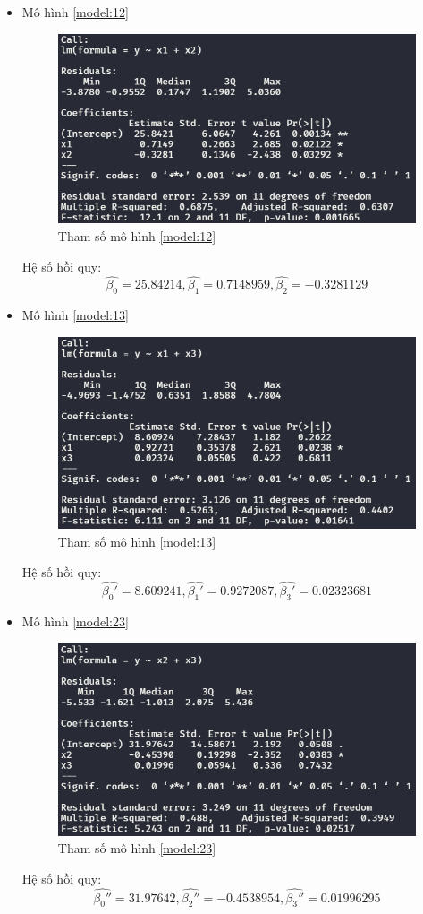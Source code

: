 \documentclass[a4paper]{article}
\theoremstyle{nonumberplain}
\begin{document}
\begin{itemize}
	\item Mô hình \ref{model:12}
	\begin{figure}[h!]
		\centering
		\includegraphics[width=0.7\linewidth]{bai-3-5-model-1}
		\caption{Tham số mô hình \ref{model:12}}
		\label{fig:bai-3-5-model-1}
	\end{figure}
	
	Hệ số hồi quy:
	\[\hat{\beta_0}=25.84214, \hat{\beta_1}=0.7148959, \hat{\beta_2}=-0.3281129\]
	
	\item Mô hình \ref{model:13}
	\begin{figure}[h]
		\centering
		\includegraphics[width=0.7\linewidth]{bai-3-5-model-2}
		\caption{Tham số mô hình \ref{model:13}}
		\label{fig:bai-3-5-model-2}
	\end{figure}
	
	Hệ số hồi quy:
	\[\hat{\beta_0'}=8.609241, \hat{\beta_1'}=0.9272087, \hat{\beta_3'}=0.02323681\]
	
	\item Mô hình \ref{model:23}
	\begin{figure}[h]
		\centering
		\includegraphics[width=0.7\linewidth]{bai-3-5-model-3}
		\caption{Tham số mô hình \ref{model:23}}
		\label{fig:bai-3-5-model-3}
	\end{figure}

	Hệ số hồi quy:
	\[\hat{\beta_0''}=31.97642, \hat{\beta_2''}=-0.4538954, \hat{\beta_3''}=0.01996295\]
\end{itemize}
\end{document}
